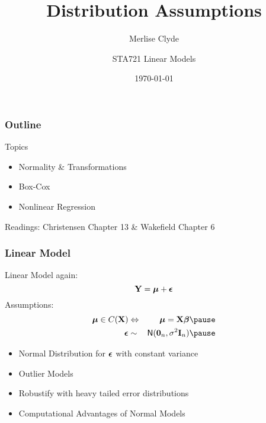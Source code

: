 \documentclass[]{beamer}
\title{Distribution Assumptions}
\subtitle{Merlise Clyde}
\author{STA721 Linear Models}
\institute{Duke University}
\date{\today}
\begin{document}
\maketitle

\begin{frame}\frametitle{Outline}
Topics
  \begin{itemize}
  \item Normality \& Transformations
  \item Box-Cox
  \item Nonlinear Regression
  \end{itemize}


Readings: Christensen  Chapter 13  \& Wakefield Chapter 6
\end{frame}
\begin{frame} \frametitle{ Linear Model}
Linear Model again:
 $$ \mathbf{Y} = \boldsymbol{\mu} + \boldsymbol{\epsilon} $$ \pause
Assumptions: \pause
\begin{eqnarray*}
   \mub \in C(\X) & \Leftrightarrow & \mub = \X \b \pause \\
   \eps  & \sim &  \N(\zero_n, \sigma^2 \I_n) \pause
\end{eqnarray*}
\begin{itemize}
\item Normal Distribution for $\boldsymbol{\epsilon}$ with constant variance \\
\item Outlier Models
\item Robustify with heavy tailed error distributions
\item Computational Advantages of Normal Models
\end{itemize}
\end{frame}
\end{document}
